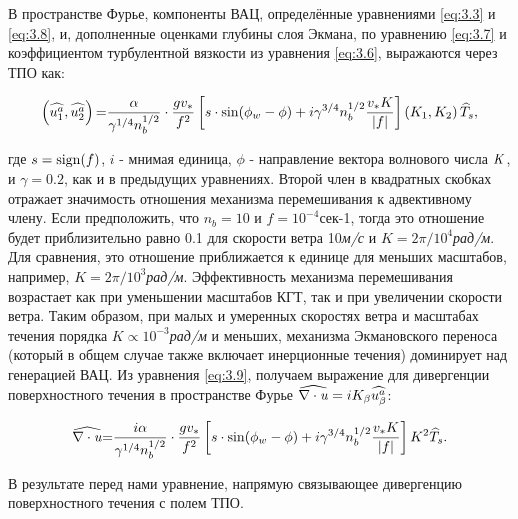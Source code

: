 В пространстве Фурье, компоненты ВАЦ, определённые уравнениями \eqref{eq:3.3} и \eqref{eq:3.8}, и, дополненные оценками глубины слоя Экмана, по уравнению \eqref{eq:3.7} и коэффициентом турбулентной вязкости из уравнения \eqref{eq:3.6}, выражаются через ТПО как:



\begin{equation} \label{eq:3.9} \left(\widehat{u_{1}^{a} },\widehat{u_{2}^{a} }\right){\rm =}\frac{\alpha }{\gamma ^{1/4} n_{b}^{1/2} } \cdot \frac{gv_{*} }{f^{2} } \left[s\cdot \sin (\phi _{w} -\phi )+i\gamma ^{3/4} n_{b}^{1/2} \frac{v_{*} K}{\left|f\right|} \right]\left(K_{1} ,K_{2} \right)\widehat{T}_{s} ,  \end{equation} 



\noindent где $s={\rm sign}(f)$, $i$ - мнимая единица, $\phi $ - направление вектора волнового числа ${\it K}$, и $\gamma =0.2$, как и в предыдущих уравнениях. Второй член в квадратных скобках отражает значимость отношения механизма перемешивания к адвективному члену. Если предположить, что $n_{b} =10$ и $f=10^{-4} $сек-1, тогда это отношение будет приблизительно равно 0.1 для скорости ветра 10\textit{м/с} и $K=2\pi /10^{4} $\textit{рад/м}. Для сравнения, это отношение приближается к единице для меньших масштабов, например, $K=2\pi /10^{3} $\textit{рад/м}. Эффективность механизма перемешивания возрастает как при уменьшении масштабов КГТ, так и при увеличении скорости ветра. Таким образом, при малых и умеренных скоростях ветра и масштабах течения порядка $K\propto 10^{-3} $\textit{рад/м} и меньших, механизма Экмановского переноса (который в общем случае также включает инерционные течения) доминирует над генерацией ВАЦ. Из уравнения \eqref{eq:3.9}, получаем выражение для дивергенции поверхностного течения в пространстве Фурье $\widehat{\nabla \cdot {\it u}}=iK_{\beta } \widehat{u_{\beta }^{a} }$:



\begin{equation} \label{eq:3.10} \widehat{\nabla \cdot {\it u}}{\rm =}\frac{i\alpha }{\gamma ^{1/4} n_{b}^{1/2} } \cdot \frac{gv_{*} }{f^{2} } \left[s\cdot \sin (\phi _{w} -\phi )+i\gamma ^{3/4} n_{b}^{1/2} \frac{v_{*} K}{\left|f\right|} \right]K^{2} \widehat{T}_{s} .  \end{equation} 



В результате перед нами уравнение, напрямую связывающее дивергенцию поверхностного течения с полем ТПО.



